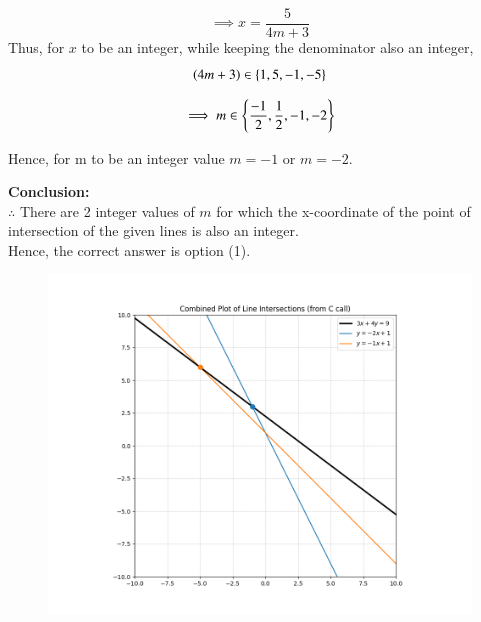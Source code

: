 \documentclass[journal,12pt,onecolumn]{IEEEtran}
\theoremstyle{remark}
\begin{document}
\begin{equation}
    \implies x = \frac{5}{4m+3}
\end{equation}
Thus, for $x$ to be an integer, while keeping the denominator also an integer,\\
\begin{equation}
\left(4m+3\right) \in \left\{1,5,-1,-5\right\}
\end{equation}

\begin{equation}
    \implies m \in \left\{\frac{-1}{2},\frac{1}{2},-1,-2\right\}
\end{equation}

Hence, for m to be an integer value $m = -1$ or $m = -2$.

\textbf{Conclusion: }\\
$\therefore$ There are 2 integer values of $m$ for which the x-coordinate of the point of intersection of the given lines is also an integer.\\
Hence, the correct answer is option (1).

\begin{figure}[H]
    \centering
    \includegraphics[width=0.75\columnwidth]{figs/1.png}
    \caption{}
\end{figure}
\end{document}
